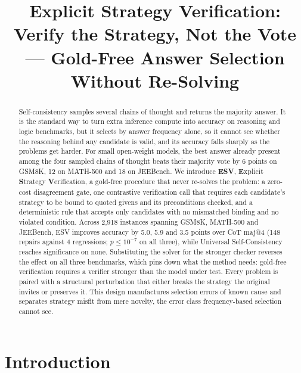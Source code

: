 \documentclass[letterpaper]{article} %
\title{Explicit Strategy Verification:\\ Verify the Strategy, Not the Vote --- Gold-Free Answer Selection Without Re-Solving}
\newcommand{\method}{\textsc{ESV}}   %
\begin{document}

\maketitle

\begin{abstract}
Self-consistency samples several chains of thought and returns the majority
answer. It is the standard way to turn extra inference compute into accuracy on
reasoning and logic benchmarks, but it selects by answer frequency alone, so it
cannot see whether the reasoning behind any candidate is valid, and its accuracy
falls sharply as the problems get harder. For small open-weight models, the best
answer already present among the four sampled chains of thought
beats their majority vote by 6 points on GSM8K, 12 on MATH-500 and 18 on
JEEBench. We introduce \textbf{\method{}}, \textbf{E}xplicit \textbf{S}trategy \textbf{V}erification, a gold-free procedure that never re-solves the problem: a zero-cost disagreement gate, one contrastive
verification call that requires each candidate's strategy to be bound to quoted givens and its preconditions checked, and a deterministic rule that accepts only
candidates with no mismatched binding and no violated condition. Across 2,918 instances spanning GSM8K, MATH-500 and JEEBench, \method{} improves accuracy by 5.0, 5.9 and 3.5 points over CoT maj@4 (148 repairs against 4 regressions; $p \le 10^{-7}$ on all three), while Universal Self-Consistency reaches significance
on none. Substituting the solver for the stronger checker reverses the
effect on all three benchmarks, which pins down what the method needs: gold-free
verification requires a verifier stronger than the model under test. Every problem is paired with a
structural perturbation that either breaks the strategy the original invites or
preserves it. This design manufactures selection errors of known cause and
separates strategy misfit from mere novelty, the error class frequency-based
selection cannot see.
\end{abstract}

\section{Introduction}
\end{document}
